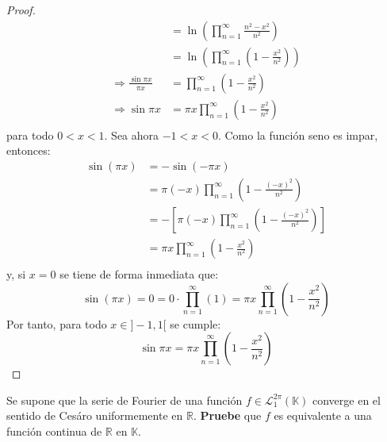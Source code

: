 \documentclass[12pt]{report}
\newcounter{it}
\theoremstyle{largebreak}
\begin{document}
\begin{proof}
\begin{equation*}
\begin{split}
                &=\ln\left(\prod_{ n=1}^\infty\frac{n^2-x^2}{n^2}\right)\\
                &=\ln\left(\prod_{ n=1}^\infty\left(1-\frac{x^2}{n^2}\right) \right)\\
                \Rightarrow \frac{\sin \pi x}{\pi x}&=\prod_{ n=1}^\infty\left(1-\frac{x^2}{n^2}\right)\\
                \Rightarrow \sin\pi x&=\pi x\prod_{ n=1}^\infty\left(1-\frac{x^2}{n^2}\right)\\
            \end{split}
        \end{equation*}
        para todo $0<x<1$. Sea ahora $-1<x<0$. Como la función seno es impar, entonces:
        \begin{equation*}
            \begin{split}
                \sin(\pi x)&=-\sin(-\pi x)\\
                &=\pi (-x)\prod_{ n=1}^\infty\left(1-\frac{(-x)^2}{n^2}\right)\\
                &=-\left[\pi (-x)\prod_{ n=1}^\infty\left(1-\frac{(-x)^2}{n^2}\right)\right] \\
                &=\pi x\prod_{ n=1}^\infty\left(1-\frac{x^2}{n^2}\right)\\
            \end{split}
        \end{equation*}
        y, si $x=0$ se tiene de forma inmediata que:
        \begin{equation*}
            \sin(\pi x)=0=0\cdot\prod_{ n=1}^\infty\left(1\right)=\pi x\prod_{ n=1}^\infty\left(1-\frac{x^2}{n^2}\right)
        \end{equation*}
        Por tanto, para todo $x\in]-1,1[$ se cumple:
        \begin{equation*}
            \sin\pi x=\pi x\prod_{ n=1}^\infty\left(1-\frac{x^2}{n^2}\right)
        \end{equation*}
    \end{proof}

    \begin{excer}
        Se supone que la serie de Fourier de una función $f\in\mathcal{L}_1^{2\pi}(\mathbb{K})$ converge en el sentido de Cesáro uniformemente en $\mathbb{R}$. \textbf{Pruebe} que $f$ es equivalente a una función continua de $\mathbb{R}$ en $\mathbb{K}$.
    \end{excer}
\end{document}
